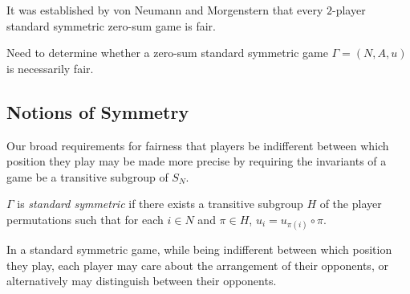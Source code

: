 It was established by von Neumann and Morgenstern \cite[Pages 165-166]{VNM} that every $2$-player standard symmetric zero-sum game is fair. 

Need to determine whether a zero-sum standard symmetric game $\Gamma = (N, A, u)$ is necessarily fair.


\subsection{Notions of Symmetry} \label{subsec:labeldepnotionsofsymmetry}
Our broad requirements for fairness that players be indifferent between which position they play may be made more precise by requiring the invariants of a game be a transitive subgroup of $S_N$.

\begin{definition}
	$\Gamma$ is \textit{standard symmetric} \cite{NoahXE} if there exists a transitive subgroup $H$ of the player permutations such that for each $i \in N$ and $\pi \in H$, $u_i = u_{\pi(i)} \circ \pi$. 
\end{definition}

	In a standard symmetric game, while being indifferent between which position they play, each player may care about the arrangement of their opponents, or alternatively may distinguish between their opponents.

